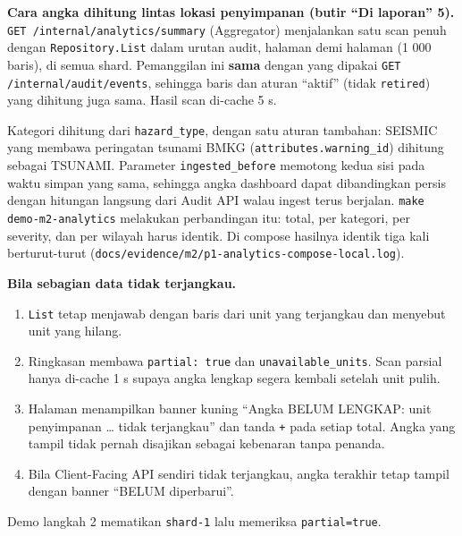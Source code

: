 \textbf{Cara angka dihitung lintas lokasi penyimpanan (butir ``Di laporan'' 5).} \texttt{GET /\allowbreak{}internal/\allowbreak{}analytics/\allowbreak{}summary} (Aggregator) menjalankan satu scan penuh dengan \texttt{Repository.\allowbreak{}List} dalam urutan audit, halaman demi halaman (1 000 baris), di semua shard. Pemanggilan ini \textbf{sama} dengan yang dipakai \texttt{GET /\allowbreak{}internal/\allowbreak{}audit/\allowbreak{}events}, sehingga baris dan aturan ``aktif'' (tidak \texttt{retired}) yang dihitung juga sama. Hasil scan di-cache 5 s.


Kategori dihitung dari \texttt{hazard\_\allowbreak{}type}, dengan satu aturan tambahan: SEISMIC yang membawa peringatan tsunami BMKG (\texttt{attributes.\allowbreak{}warning\_\allowbreak{}id}) dihitung sebagai TSUNAMI. Parameter \texttt{ingested\_\allowbreak{}before} memotong kedua sisi pada waktu simpan yang sama, sehingga angka dashboard dapat dibandingkan persis dengan hitungan langsung dari Audit API walau ingest terus berjalan. \texttt{make demo-\allowbreak{}m2-\allowbreak{}analytics} melakukan perbandingan itu: total, per kategori, per severity, dan per wilayah harus identik. Di compose hasilnya identik tiga kali berturut-turut (\texttt{docs/\allowbreak{}evidence/\allowbreak{}m2/\allowbreak{}p1-\allowbreak{}analytics-\allowbreak{}compose-\allowbreak{}local.\allowbreak{}log}).


\textbf{Bila sebagian data tidak terjangkau.}


\begin{enumerate}
\item \texttt{List} tetap menjawab dengan baris dari unit yang terjangkau dan menyebut unit yang hilang.
\item Ringkasan membawa \texttt{partial: true} dan \texttt{unavailable\_\allowbreak{}units}. Scan parsial hanya di-cache 1 s supaya angka lengkap segera kembali setelah unit pulih.
\item Halaman menampilkan banner kuning ``Angka BELUM LENGKAP: unit penyimpanan \ldots{} tidak terjangkau'' dan tanda \texttt{+} pada setiap total. Angka yang tampil tidak pernah disajikan sebagai kebenaran tanpa penanda.
\item Bila Client-Facing API sendiri tidak terjangkau, angka terakhir tetap tampil dengan banner ``BELUM diperbarui''.
\end{enumerate}

Demo langkah 2 mematikan \texttt{shard-\allowbreak{}1} lalu memeriksa \texttt{partial=\allowbreak{}true}.

